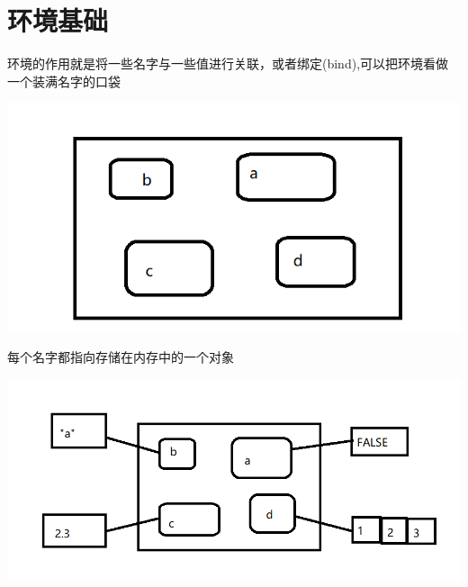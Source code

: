 \documentclass[]{book}
\newenvironment{Shaded}{\begin{snugshade}}{\end{snugshade}}
\newcommand{\KeywordTok}[1]{\textcolor[rgb]{0.13,0.29,0.53}{\textbf{#1}}}
\newcommand{\DecValTok}[1]{\textcolor[rgb]{0.00,0.00,0.81}{#1}}
\newcommand{\FloatTok}[1]{\textcolor[rgb]{0.00,0.00,0.81}{#1}}
\newcommand{\StringTok}[1]{\textcolor[rgb]{0.31,0.60,0.02}{#1}}
\newcommand{\OtherTok}[1]{\textcolor[rgb]{0.56,0.35,0.01}{#1}}
\newcommand{\OperatorTok}[1]{\textcolor[rgb]{0.81,0.36,0.00}{\textbf{#1}}}
\newcommand{\NormalTok}[1]{#1}
\begin{document}
\section{环境基础}

环境的作用就是将一些名字与一些值进行关联，或者绑定(bind),可以把环境看做一个装满名字的口袋

\begin{center}\includegraphics{img/ch7-1} \end{center}

每个名字都指向存储在内存中的一个对象

\begin{Shaded}
\end{Shaded}

\begin{center}\includegraphics{img/ch7-2} \end{center}
\end{document}
